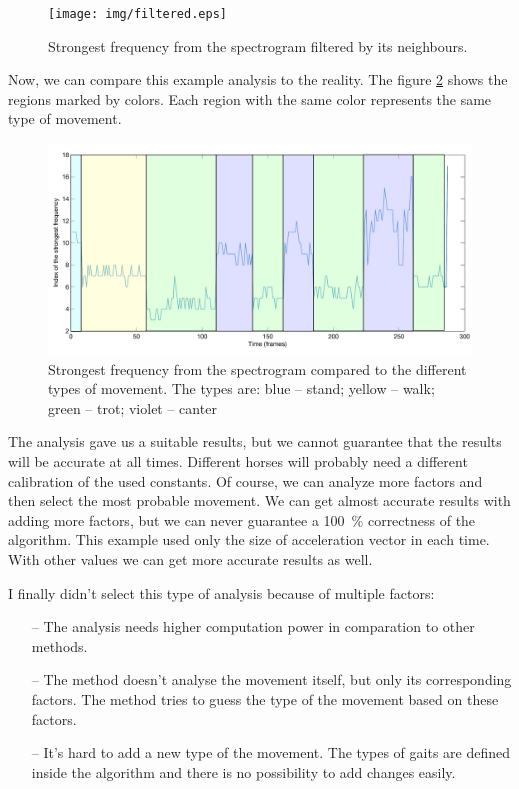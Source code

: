 \begin{figure}
	\centering
	\label{fig:spectralFiltered}
	\caption{Strongest frequency from the spectrogram filtered by its neighbours.}
	\texttt{[image: img/filtered.eps]}
\end{figure}

Now, we can compare this example analysis to the reality. The figure \ref{fig:spectralMarked} shows the regions marked by colors. Each region with the same color represents the same type of movement.

\begin{figure}
	\centering
	\label{fig:spectralMarked}
	\caption{Strongest frequency from the spectrogram compared to the different types of movement. The types are: blue -- stand; yellow -- walk; green -- trot; violet -- canter}
	\includegraphics[width=\linewidth]{img/filteredMarked.pdf}
\end{figure}

The analysis gave us a suitable results, but we cannot guarantee that the results will be accurate at all times. Different horses will probably need a different calibration of the used constants. Of course, we can analyze more factors and then select the most probable movement. We can get almost accurate results with adding more factors, but we can never guarantee a \SI{100}{\%} correctness of the algorithm. This example used only the size of acceleration vector in each time. With other values we can get more accurate results as well.

I finally didn't select this type of analysis because of multiple factors:
\begin{itemize}
	\item[--] The analysis needs higher computation power in comparation to other methods.
	\item[--] The method doesn't analyse the movement itself, but only its corresponding factors. The method tries to guess the type of the movement based on these factors.
	\item[--] It's hard to add a new type of the movement. The types of gaits are defined inside the algorithm and there is no possibility to add changes easily.
\end{itemize}

